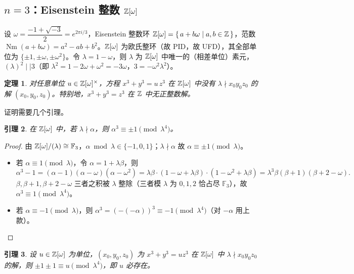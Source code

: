 \documentclass{article}
\newcommand{\Nm}{\operatorname{Nm}}
\theoremstyle{plain}
\newtheorem{thm}{定理}[section]
\newtheorem{lem}[thm]{引理}
\theoremstyle{definition}
\theoremstyle{remark}
\begin{document}
\subsection{$n=3$：Eisenstein 整数 $\mathbb{Z}[\omega]$}

设 $\omega=\dfrac{-1+\sqrt{-3}}2=e^{2\pi i/3}$，Eisenstein 整数环 $\mathbb{Z}[\omega]=\{\,a+b\omega\mid a,b\in\mathbb{Z}\,\}$，范数 $\Nm(a+b\omega)=a^2-ab+b^2$。$\mathbb{Z}[\omega]$ 为欧氏整环（故 PID，故 UFD），其全部单位为 $\{\pm1,\pm\omega,\pm\omega^2\}$。令 $\lambda=1-\omega$，则 $\lambda$ 为 $\mathbb{Z}[\omega]$ 中唯一的（相差单位）素元，$(\lambda)^2\mid\mid 3$（即 $\lambda^2=1-2\omega+\omega^2=-3\omega$，$3=-\omega^2\lambda^2$）。

\begin{thm}\label{thm:flt3}
  对任意单位 $u\in\mathbb{Z}[\omega]^\times$，方程 $x^3+y^3=u\,z^3$ 在 $\mathbb{Z}[\omega]$ 中没有 $\lambda\nmid x_0y_0z_0$ 的解 $(x_0,y_0,z_0)$。特别地，$x^3+y^3=z^3$ 在 $\mathbb{Z}$ 中无正整数解。
\end{thm}

证明需要几个引理。

\begin{lem}\label{lem:eis-cube}
  在 $\mathbb{Z}[\omega]$ 中，若 $\lambda\nmid\alpha$，则 $\alpha^3\equiv\pm1\pmod{\lambda^4}$。
\end{lem}

\begin{proof}
  由 $\mathbb{Z}[\omega]/(\lambda)\cong\mathbb{F}_3$，$\alpha\bmod\lambda\in\{-1,0,1\}$；$\lambda\nmid\alpha$ 故 $\alpha\equiv\pm1\pmod\lambda$。
  \begin{itemize}
    \item 若 $\alpha\equiv1\pmod\lambda$，令 $\alpha=1+\lambda\beta$，则
      \[
        \alpha^3-1=(\alpha-1)(\alpha-\omega)(\alpha-\omega^2)=\lambda\beta\cdot(1-\omega+\lambda\beta)\cdot(1-\omega^2+\lambda\beta)=\lambda^3\beta(\beta+1)(\beta+2-\omega).
      \]
      $\beta,\beta+1,\beta+2-\omega$ 三者之积被 $\lambda$ 整除（三者模 $\lambda$ 为 $0,1,2$ 恰占尽 $\mathbb{F}_3$），故 $\alpha^3\equiv1\pmod{\lambda^4}$。
    \item 若 $\alpha\equiv-1\pmod\lambda$，则 $\alpha^3=(-(-\alpha))^3\equiv-1\pmod{\lambda^4}$（对 $-\alpha$ 用上款）。
  \end{itemize}
\end{proof}

\begin{lem}\label{lem:eis-z}
  设 $u\in\mathbb{Z}[\omega]$ 为单位，$(x_0,y_0,z_0)$ 为 $x^3+y^3=uz^3$ 在 $\mathbb{Z}[\omega]$ 中 $\lambda\nmid x_0y_0z_0$ 的解，则 $\pm1\pm1\equiv u\pmod{\lambda^4}$，即 $u$ 必存在。
\end{lem}
\end{document}
